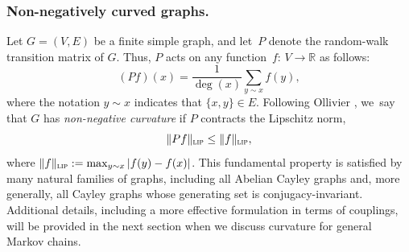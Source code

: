 \documentclass[10pt]{amsart}
\theoremstyle{definition}
\newcommand{\dR}{\mathbb {R}}
\newcommand{\lip}{\textup{\textsc{lip}}}
\begin{document}
\subsubsection*{Non-negatively curved graphs.}Let $G=(V,E)$ be a finite simple graph, and let~$P$ denote the random-walk transition matrix of $G$. Thus, $P$ acts on any \hbox{function $f{:}\, V\!\to\!\dR$} as follows:
\begin{equation*}
(Pf)(x) = \frac{1}{\deg(x)}\sum_{y\sim x}f(y),
\end{equation*}
where the notation $y\sim x$ indicates that $\{x,y\}\in E$. Following Ollivier \cite{ollivier2009ricci,ollivier2010survey}, we~say that $G$ has \emph{non-negative curvature} if $P$ contracts the Lipschitz norm, \ie
\begin{equation*}
\|Pf\|_{\lip} \le \|f\|_{\lip},
\end{equation*}
where $\|f\|_{\lip}:=\max_{y\sim x }{|f(y)-f(x)|}$.
This fundamental property is satisfied by many natural families of graphs, including all Abelian Cayley graphs and, more generally, all Cayley graphs whose generating set is conjugacy-invariant.
Additional details, including a more effective formulation in terms of couplings, will be provided in the next section when we discuss curvature for general Markov chains.
\end{document}
